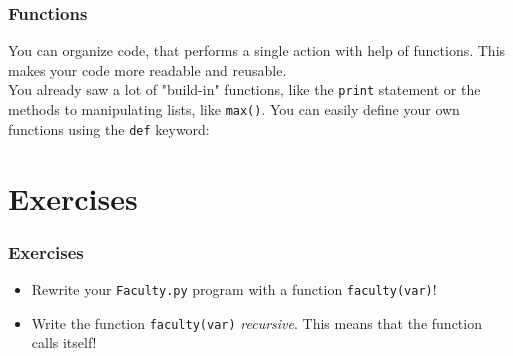 \documentclass{beamer}
\begin{document}
\begin{frame}
\frametitle{Functions}
	You can organize code, that performs a single action with help of functions. This makes your code more readable and reusable. \\ You already saw a lot of "build-in" functions, like the \texttt{print} statement or the methods to manipulating lists, like \texttt{max()}. You can easily define your own functions using the \texttt{def} keyword:
	 
\end{frame}

\section{Exercises}

\begin{frame}
\frametitle{Exercises}
	\begin{itemize}
		\item Rewrite your \texttt{Faculty.py} program with a function \texttt{faculty(var)}!
		\item Write the function \texttt{faculty(var)} \textit{recursive}. This means that the function calls itself!
	\end{itemize}
\end{frame}
\end{document}
